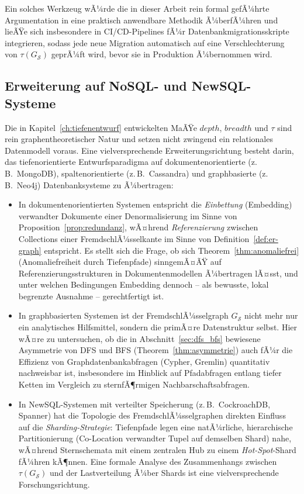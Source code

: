 ﻿\documentclass[a4paper,12pt]{report}
\theoremstyle{definition}
\theoremstyle{remark}
\newcommand{\depth}{\mathit{depth}}
\newcommand{\breadth}{\mathit{breadth}}
\begin{document}
Ein solches Werkzeug wÃ¼rde die in dieser Arbeit rein formal gefÃ¼hrte
Argumentation in eine praktisch anwendbare Methodik Ã¼berfÃ¼hren und
lieÃŸe sich insbesondere in CI/CD-Pipelines fÃ¼r
Datenbankmigrationsskripte integrieren, sodass jede neue Migration
automatisch auf eine Verschlechterung von $\tau(G_{\mathcal{S}})$
geprÃ¼ft wird, bevor sie in Produktion Ã¼bernommen wird.

\subsection{Erweiterung auf NoSQL- und NewSQL-Systeme}
\label{sec:ausblick-nosql}

Die in Kapitel~\ref{ch:tiefenentwurf} entwickelten MaÃŸe $\depth$,
$\breadth$ und $\tau$ sind rein graphentheoretischer Natur und setzen
nicht zwingend ein relationales Datenmodell voraus. Eine
vielversprechende Erweiterungsrichtung besteht darin, das
tiefenorientierte Entwurfsparadigma auf dokumentenorientierte
(z.\,B.\ MongoDB), spaltenorientierte (z.\,B.\ Cassandra) und
graphbasierte (z.\,B.\ Neo4j) Datenbanksysteme zu Ã¼bertragen:

\begin{itemize}
  \item In dokumentenorientierten Systemen entspricht die
    \emph{Einbettung} (Embedding) verwandter Dokumente einer
    Denormalisierung im Sinne von Proposition~\ref{prop:redundanz},
    wÃ¤hrend \emph{Referenzierung} zwischen Collections einer
    FremdschlÃ¼sselkante im Sinne von Definition~\ref{def:er-graph}
    entspricht. Es stellt sich die Frage, ob sich
    Theorem~\ref{thm:anomaliefrei} (Anomaliefreiheit durch
    Tiefenpfade) sinngemÃ¤ÃŸ auf Referenzierungsstrukturen in
    Dokumentenmodellen Ã¼bertragen lÃ¤sst, und unter welchen Bedingungen
    Embedding dennoch -- als bewusste, lokal begrenzte Ausnahme --
    gerechtfertigt ist.
  \item In graphbasierten Systemen ist der FremdschlÃ¼sselgraph
    $G_{\mathcal{S}}$ nicht mehr nur ein analytisches Hilfsmittel,
    sondern die primÃ¤re Datenstruktur selbst. Hier wÃ¤re zu
    untersuchen, ob die in Abschnitt~\ref{sec:dfs_bfs} bewiesene
    Asymmetrie von DFS und BFS (Theorem~\ref{thm:asymmetrie}) auch fÃ¼r
    die Effizienz von Graphdatenbankabfragen (Cypher, Gremlin)
    quantitativ nachweisbar ist, insbesondere im Hinblick auf
    Pfadabfragen entlang tiefer Ketten im Vergleich zu
    sternfÃ¶rmigen Nachbarschaftsabfragen.
  \item In NewSQL-Systemen mit verteilter Speicherung (z.\,B.\
    CockroachDB, Spanner) hat die Topologie des FremdschlÃ¼sselgraphen
    direkten Einfluss auf die \emph{Sharding-Strategie}: Tiefenpfade
    legen eine natÃ¼rliche, hierarchische Partitionierung
    (Co-Location verwandter Tupel auf demselben Shard) nahe, wÃ¤hrend
    Sternschemata mit einem zentralen Hub zu einem
    \emph{Hot-Spot}-Shard fÃ¼hren kÃ¶nnen. Eine formale Analyse des
    Zusammenhangs zwischen $\tau(G_{\mathcal{S}})$ und der
    Lastverteilung Ã¼ber Shards ist eine vielversprechende
    Forschungsrichtung.
\end{itemize}
\end{document}

